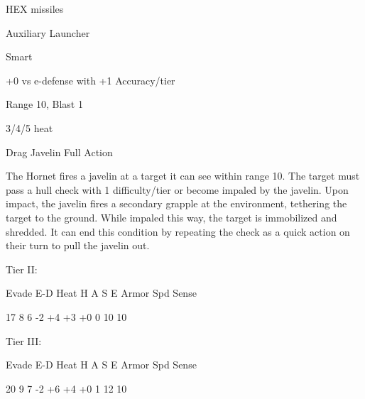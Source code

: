 HEX missiles
 
Auxiliary Launcher
 
Smart
 
+0 vs e-defense with +1 Accuracy/tier
 
Range 10, Blast 1
 
3/4/5 heat
 

Drag Javelin  
Full Action
 
The Hornet fires a javelin at a target it can see within range 10. The target must pass a hull check  
with 1 difficulty/tier or become impaled by the javelin. Upon impact, the javelin fires a secondary  
grapple at the environment, tethering the target to the ground. While impaled this way, the target  
is immobilized and shredded. It can end this condition by repeating the check as a quick action  
on their turn to pull the javelin out.
 

Tier II:
 

          Evade     E-D    Heat    H     A     S     E       Armor         Spd      Sense 

          17        8      6       -2    +4    +3    +0      0             10       10 

Tier III:
 

          Evade     E-D    Heat    H     A     S     E       Armor         Spd      Sense 

          20        9      7       -2    +6    +4    +0       1            12       10 

                                                                                                                  